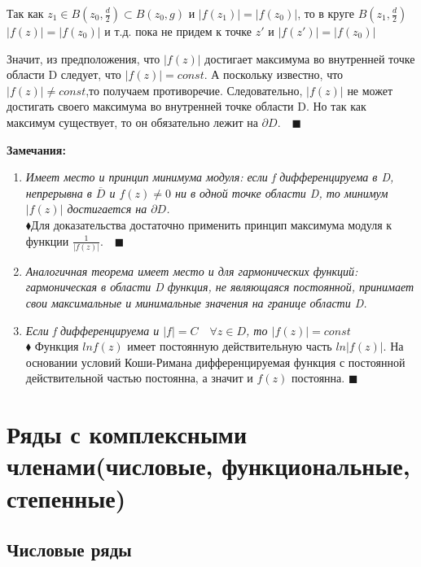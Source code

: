 \documentclass[a4paper, 12pt]{report}
\begin{document}
Так как $z_1 \in  B(z_0, \frac{d}{2}) \subset B(z_0, g) $ и $|f(z_1)|=|f(z_0)|$, то в круге $B(z_1, \frac{d}{2})$ \quad$|f(z)|=|f(z_0)|$ и т.д. пока не придем к точке $z'$ и $|f(z')|=|f(z_0)|$
\par\bigskip
Значит, из предположения, что $|f(z)|$ достигает максимума во внутренней точке области D следует, что $|f(z)|=const$. А поскольку известно, что $|f(z)|\not=const $,то получаем противоречие. Следовательно, $|f(z)|$ не может достигать своего максимума во внутренней точке области D. Но так как максимум существует, то он обязательно лежит на $\partial D.\quad \blacksquare$
\quad\bigskip

\textbf{Замечания:}
\begin{enumerate}
    \item \textit{ Имеет место и принцип минимума модуля: если f дифференцируема в D, непрерывна в $\overline{D}$ и $f(z)\not= 0$ ни в одной точке области D, то минимум $|f(z)|$ достигается на $\partial D$.}\\
    $\blacklozenge$\quad  Для доказательства достаточно применить принцип максимума модуля к функции $\frac1{|f(z)|}.\quad \blacksquare$

    \item \textit{Аналогичная теорема имеет место и для гармонических функций: гармоническая в области D функция, не являющаяся постоянной, принимает свои максимальные  и минимальные значения на границе области D.}
    
    \item \textit{ Если f дифференцируема и $|f|=C \quad \forall z\in D$, то $|f(z)|=const$ } \\
    $\blacklozenge$ \quad Функция $ln f(z)$ имеет постоянную действительную часть 
    $ln |f(z)|$. На основании условий Коши-Римана дифференцируемая функция с постоянной действительной частью постоянна, а значит и $f(z)$ постоянна. \quad $\blacksquare$
\end{enumerate}








\section{Ряды с комплексными членами(числовые, функциональные, степенные)}
\subsection{Числовые ряды}
\end{document}
